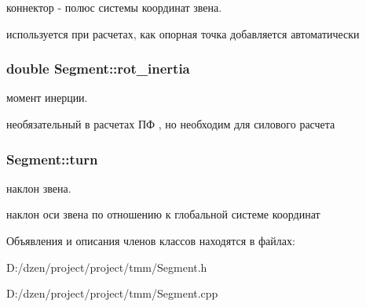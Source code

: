 коннектор -\/ полюс системы координат звена. 

используется при расчетах, как опорная точка добавляется автоматически \hypertarget{class_segment_a9559a2939e6df5ff37f8b30bd2e489ad}{
\subsubsection[{rot\_\-inertia}]{\setlength{\rightskip}{0pt plus 5cm}double {\bf Segment::rot\_\-inertia}}}
\label{class_segment_a9559a2939e6df5ff37f8b30bd2e489ad}


момент инерции. 

необязательный в расчетах ПФ , но необходим для силового расчета \hypertarget{class_segment_af72f1d60a478761af1f157a4d949e660}{
\subsubsection[{turn}]{ {\bf Segment::turn}}}
\label{class_segment_af72f1d60a478761af1f157a4d949e660}


наклон звена. 

наклон оси звена по отношению к глобальной системе координат 

Объявления и описания членов классов находятся в файлах:\begin{DoxyCompactItemize}
\item 
D:/dzen/project/project/tmm/Segment.h\item 
D:/dzen/project/project/tmm/Segment.cpp\end{DoxyCompactItemize}
